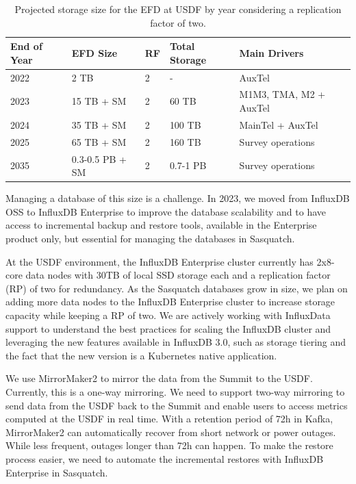 \begin{table}[ht]
    \centering
    \caption{Projected storage size for the EFD at USDF by year considering a replication factor of two.}
    \begin{tabular}{@{}lllll@{}}
        \toprule
        \textbf{End of Year} & \textbf{EFD Size} & \textbf{RF} & \textbf{Total Storage} & \textbf{Main Drivers} \\
        \midrule
        2022 & 2 TB & 2 & - & AuxTel \\
        2023 & 15 TB + SM & 2 & 60 TB & M1M3, TMA, M2 + AuxTel \\
        2024 & 35 TB + SM & 2 & 100 TB & MainTel + AuxTel \\
        2025 & 65 TB + SM & 2 & 160 TB & Survey operations \\
        2035 & 0.3-0.5 PB + SM & 2 & 0.7-1 PB & Survey operations \\
        \bottomrule
    \end{tabular}
\end{table}

Managing a database of this size is a challenge. In 2023, we moved from InfluxDB OSS to InfluxDB Enterprise to improve the database scalability and to have access to incremental backup and restore tools, available in the Enterprise product only, but essential for managing the databases in Sasquatch.

At the USDF environment, the InfluxDB Enterprise cluster currently has 2x8-core data nodes with 30TB of local SSD storage each and a replication factor (RP) of two for redundancy. As the Sasquatch databases grow in size, we plan on adding more data nodes to the InfluxDB Enterprise cluster to increase storage capacity while keeping a RP of two. We are actively working with InfluxData support to understand the best practices for scaling the InfluxDB cluster and leveraging the new features available in InfluxDB 3.0, such as storage tiering and the fact that the new version is a Kubernetes native application.

We use MirrorMaker2 to mirror the data from the Summit to the USDF. Currently, this is a one-way mirroring. We need to support two-way mirroring to send data from the USDF back to the Summit and enable users to access metrics computed at the USDF in real time. With a retention period of 72h in Kafka, MirrorMaker2 can automatically recover from short network or power outages. While less frequent, outages longer than 72h can happen. To make the restore process easier, we need to automate the incremental restores with InfluxDB Enterprise in Sasquatch.

